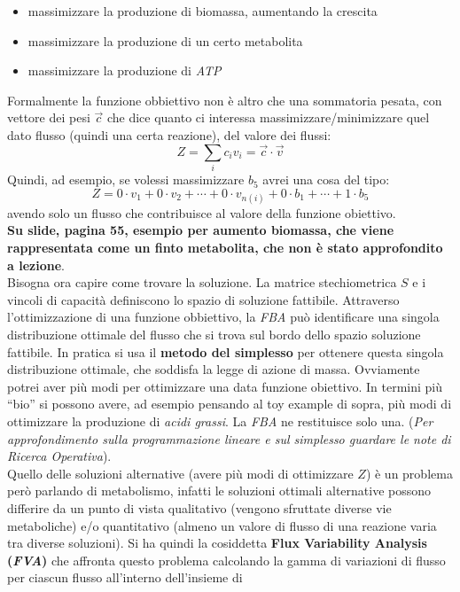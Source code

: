 \documentclass[a4paper,12pt, oneside]{book}
\begin{document}
\begin{itemize}
  \item massimizzare la produzione di biomassa, aumentando la crescita
  \item massimizzare la produzione di un certo metabolita
  \item massimizzare la produzione di \textit{ATP}
\end{itemize}
Formalmente la funzione obbiettivo non è altro che una sommatoria pesata, con
vettore dei pesi $\vec{c}$ che dice quanto ci interessa massimizzare/minimizzare
quel dato flusso (quindi una certa reazione), del
valore dei flussi:
\[Z=\sum_i c_iv_i=\vec{c}\cdot \vec{v}\]
Quindi, ad esempio, se volessi massimizzare $b_5$ avrei una cosa del tipo:
\[Z=0\cdot v_1+0\cdot v_2+\cdots+0\cdot v_{n(i)}+0\cdot b_1+\cdots+1\cdot b_5\]
avendo solo un flusso che contribuisce al valore della funzione obiettivo.\\
\textbf{Su slide, pagina 55, esempio per aumento biomassa, che viene
  rappresentata come un finto metabolita, che non è stato
  approfondito a lezione}.\\
Bisogna ora capire come trovare la soluzione. La matrice stechiometrica $S$ e i
vincoli di capacità definiscono lo spazio di soluzione fattibile. Attraverso
l'ottimizzazione di una funzione obbiettivo, la \textit{FBA} può identificare
una singola distribuzione ottimale del flusso che si trova sul bordo dello
spazio 
soluzione fattibile. In pratica si usa il \textbf{metodo del simplesso} per
ottenere questa singola distribuzione ottimale, che soddisfa la legge di azione
di massa. Ovviamente potrei aver più modi per ottimizzare una data funzione
obiettivo. In termini più ``bio'' si possono avere, ad esempio pensando al toy
example di sopra, più modi di ottimizzare la produzione di \textit{acidi
  grassi}. La \textit{FBA} ne restituisce solo una.
(\textit{Per approfondimento sulla programmazione lineare e sul simplesso
  guardare le note di Ricerca Operativa}). \\
Quello delle soluzioni alternative (avere più modi di ottimizzare $Z$) è un
problema però parlando di metabolismo, infatti le soluzioni ottimali alternative
possono differire da un punto di vista qualitativo (vengono sfruttate diverse
vie metaboliche) e/o quantitativo (almeno un valore di flusso di una reazione
varia tra diverse soluzioni). Si ha quindi la cosiddetta \textbf{Flux
  Variability Analysis (\textit{FVA})} che affronta questo problema calcolando
la gamma di variazioni di flusso per ciascun flusso all'interno dell'insieme di
\end{document}
